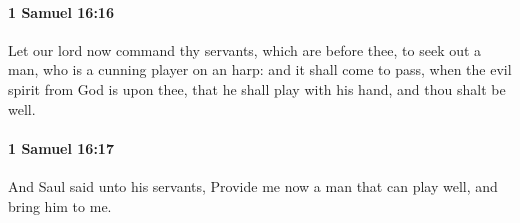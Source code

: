 		\paragraph{1 Samuel 16:16} %
			\label{1SAMUEL-16-16}

			Let our lord now command thy servants, which are before thee, to seek out a man, who is a cunning player on an harp: and it shall come to pass, when the evil spirit from God is upon thee, that he shall play with his hand, and thou shalt be well.


		\paragraph{1 Samuel 16:17} %
			\label{1SAMUEL-16-17}

			And Saul said unto his servants, Provide me now a man that can play well, and bring him to me.


